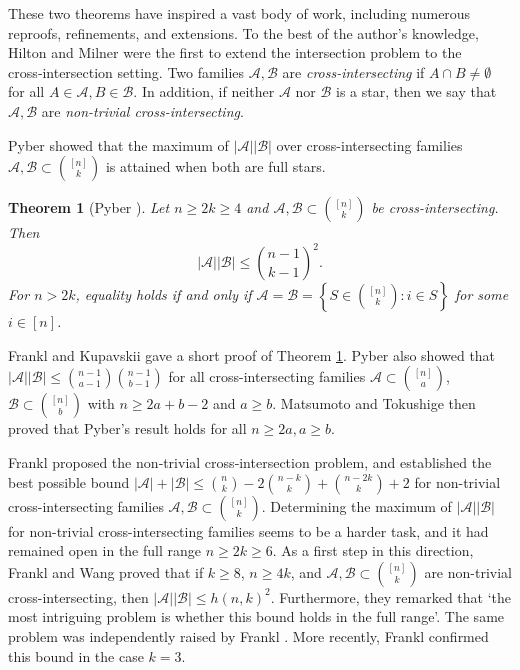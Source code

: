 \documentclass[a4paper,11pt]{article}
\newtheorem{theorem}{Theorem}[section]
\newcommand{\m}{\mathcal}
\begin{document}
These two theorems have inspired a vast body of work, 
including numerous reproofs, refinements, and extensions.
 To the best of the author's knowledge, Hilton and Milner \cite{HM1967} were the first to extend the intersection problem to the cross‑intersection setting. 
Two families $\m A, \m B$ are {\it cross-intersecting} if $A\cap B\ne \emptyset$ for all $A\in \m A, B \in \m B$. In addition, if neither $\m A$ nor $\m B$ is a star, then we say that $\m A, \m B$ are {\it non-trivial cross-intersecting}. 


Pyber \cite{Pyber1986} showed that the maximum of 
$|\mathcal{A}||\mathcal{B}|$ over cross-intersecting families 
$\mathcal{A},\mathcal{B}\subset\binom{[n]}{k}$ 
is attained when both are full stars.
\begin{theorem}[Pyber \cite{Pyber1986}]\label{3-17-1}
Let  $ n \ge 2k \ge 4 $ and $ \mathcal{A}, \m B \subset \binom{[n]}{k} $ be cross-intersecting. Then
\[
|\mathcal{A}| |\mathcal{B}| \leq \binom{n-1}{k-1}^2.
\]
For $ n > 2k $, equality holds if and only if $ \mathcal{A} = \mathcal{B} = \left\{ S \in \binom{[n]}{k} : i \in S \right\} $ for some $i\in [n]$.
\end{theorem}
Frankl and Kupavskii \cite{3-13-2} gave a short proof of Theorem \ref{3-17-1}. 
Pyber \cite{Pyber1986} also showed that 
$|\mathcal{A}||\mathcal{B}|\le \binom{n-1}{a-1}\binom{n-1}{b-1}$ 
for all cross-intersecting families 
$\mathcal{A}\subset \binom{[n]}{a}$, 
$\mathcal{B}\subset \binom{[n]}{b}$ 
with $n\ge 2a+b-2$ and $a\ge b$.
Matsumoto and Tokushige \cite{MT1989} then proved that Pyber's result holds for all $n\ge 2a, a \ge b$.  

Frankl \cite{1-25-1} proposed the non‑trivial cross‑intersection problem, and established the best possible bound $|\m A|+|\m B|\le {n\choose k}-2{n-k\choose k}+{n-2k\choose k}+2$ for non-trivial cross-intersecting families $\m A, \m B \subset {[n]\choose k}$. 
Determining the maximum of $|\mathcal{A}| |\mathcal{B}|$ for non-trivial cross-intersecting families seems to be a harder task, and it had remained open in the full range $n\ge 2k \ge 6$. As a first step in this direction, Frankl and Wang \cite{11-6-1} proved that if $k\ge 8$, $ n\ge 4k$, and $\mathcal{A} , \mathcal{B} \subset {[n] \choose k}$ are non-trivial cross-intersecting, then $|\mathcal{A}| |\mathcal{B}| \le h(n,k)^2$. 
Furthermore, they remarked that `the most intriguing problem is whether this bound holds in the full range'. The same problem was independently raised by Frankl \cite{1-25-1}. More recently, Frankl \cite{11-6-2} confirmed this bound 
in the case $k=3$. 
\end{document}
